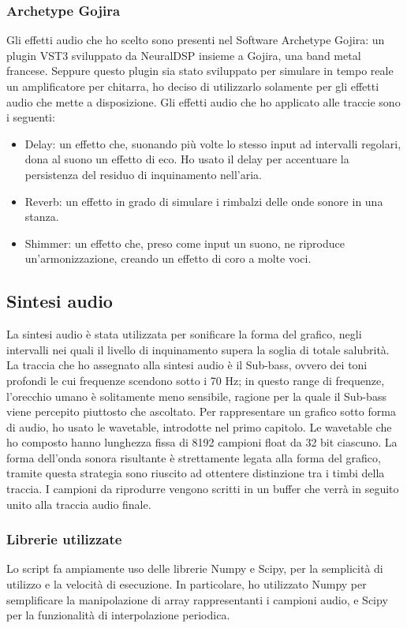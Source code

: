 \subsubsection{Archetype Gojira}
Gli effetti audio che ho scelto sono presenti nel Software Archetype Gojira: un plugin VST3 sviluppato da NeuralDSP insieme a Gojira, una band metal francese.
Seppure questo plugin sia stato sviluppato per simulare in tempo reale un amplificatore per chitarra, ho deciso di utilizzarlo solamente per gli effetti audio che mette a disposizione.
Gli effetti audio che ho applicato alle traccie sono i seguenti:
\begin{itemize}
    \item Delay: un effetto che, suonando più volte lo stesso input ad intervalli regolari, dona al suono un effetto di eco. Ho usato il delay per accentuare la persistenza del residuo di inquinamento nell'aria.
    \item Reverb: un effetto in grado di simulare i rimbalzi delle onde sonore in una stanza.
    \item Shimmer: un effetto che, preso come input un suono, ne riproduce un'armonizzazione, creando un effetto di coro a molte voci.
\end{itemize}

\subsection{Sintesi audio}
La sintesi audio è stata utilizzata per sonificare la forma del grafico, negli intervalli nei quali il livello di inquinamento supera la soglia di totale salubrità.
La traccia che ho assegnato alla sintesi audio è il Sub-bass, ovvero dei toni profondi le cui frequenze scendono sotto i 70 Hz; in questo range di frequenze, l'orecchio umano è solitamente meno sensibile, ragione per la quale il Sub-bass viene percepito piuttosto che ascoltato.
Per rappresentare un grafico sotto forma di audio, ho usato le wavetable, introdotte nel primo capitolo.
Le wavetable che ho composto hanno lunghezza fissa di 8192 campioni float da 32 bit ciascuno.
La forma dell'onda sonora risultante è strettamente legata alla forma del grafico, tramite questa strategia sono riuscito ad ottentere distinzione tra i timbi della traccia.
I campioni da riprodurre vengono scritti in un buffer che verrà in seguito unito alla traccia audio finale.
\subsubsection{Librerie utilizzate}
Lo script fa ampiamente uso delle librerie Numpy e Scipy, per la semplicità di utilizzo e la velocità di esecuzione.
In particolare, ho utilizzato Numpy per semplificare la manipolazione di array rappresentanti i campioni audio, e Scipy per la funzionalità di interpolazione periodica.
